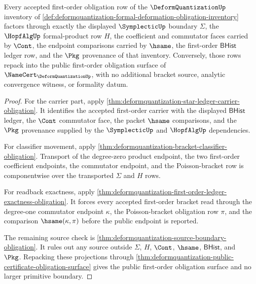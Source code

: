 \begin{theorem}
\label{thm:deformquantization-scoped-primitive-inventory}
Every accepted first-order obligation row of the $\DeformQuantizationUp$ inventory of \autoref{def:deformquantization-formal-deformation-obligation-inventory} factors through exactly the displayed $\SymplecticUp$ boundary $\Sigma$, the $\HopfAlgUp$ formal-product row $H$, the coefficient and commutator faces carried by $\Cont$, the endpoint comparisons carried by $\hsame$, the first-order $\mathsf{BHist}$ ledger row, and the $\Pkg$ provenance of that inventory. Conversely, those rows repack into the public first-order obligation surface of $\NameCert_{\DeformQuantizationUp}$, with no additional bracket source, analytic convergence witness, or formality datum.
\end{theorem}
\begin{proof}
For the carrier part, apply \autoref{thm:deformquantization-star-ledger-carrier-obligation}. It identifies the accepted first-order carrier with the displayed $\mathsf{BHist}$ ledger, the $\Cont$ commutator face, the packet $\hsame$ comparisons, and the $\Pkg$ provenance supplied by the $\SymplecticUp$ and $\HopfAlgUp$ dependencies.

For classifier movement, apply \autoref{thm:deformquantization-bracket-classifier-obligation}. Transport of the degree-zero product endpoint, the two first-order coefficient endpoints, the commutator endpoint, and the Poisson-bracket row is componentwise over the transported $\Sigma$ and $H$ rows.

For readback exactness, apply \autoref{thm:deformquantization-first-order-ledger-exactness-obligation}. It forces every accepted first-order bracket read through the degree-one commutator endpoint $\kappa$, the Poisson-bracket obligation row $\pi$, and the comparison $\hsame(\kappa,\pi)$ before the public endpoint is reported.

The remaining source check is \autoref{thm:deformquantization-source-boundary-obligation}. It rules out any source outside $\Sigma$, $H$, $\Cont$, $\hsame$, $\mathsf{BHist}$, and $\Pkg$. Repacking these projections through \autoref{thm:deformquantization-public-certificate-obligation-surface} gives the public first-order obligation surface and no larger primitive boundary.
\end{proof}

